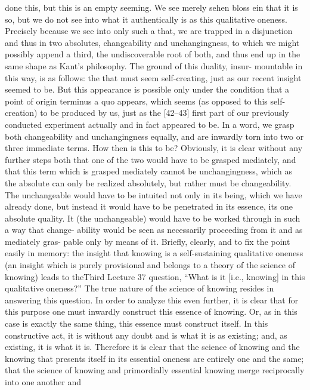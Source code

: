 done this, but this is an empty seeming. We see merely {sehen bloss ein} that it
is so, but we do not see into what it authentically is as this qualitative oneness.
Precisely because we see into only such a that, we are trapped in a disjunction
and thus in two absolutes, changeability and unchangingness, to which we
might possibly append a third, the undiscoverable root of both, and thus end
up in the same shape as Kant’s philosophy. The ground of this duality, insur-
mountable in this way, is as follows: the that must seem self-creating, just as
our recent insight seemed to be. But this appearance is possible only under the
condition that a point of origin {terminus a quo} appears, which seems (as
opposed to this self-creation) to be produced by us, just as the [42–43] first
part of our previously conducted experiment actually and in fact appeared to
be. In a word, we grasp both changeability and unchangingness equally, and
are inwardly torn into two or three immediate terms. How then is this to be?
Obviously, it is clear without any further steps both that one of the two would
have to be grasped mediately, and that this term which is grasped mediately
cannot be unchangingness, which as the absolute can only be realized
absolutely, but rather must be changeability. The unchangeable would have to
be intuited not only in its being, which we have already done, but instead it
would have to be penetrated in its essence, its one absolute quality. It (the
unchangeable) would have to be worked through in such a way that change-
ability would be seen as necessarily proceeding from it and as mediately gras-
pable only by means of it.
Briefly, clearly, and to fix the point easily in memory: the insight that
knowing is a self-sustaining qualitative oneness (an insight which is purely
provisional and belongs to a theory of the science of knowing) leads to theThird Lecture
37
question, “What is it [i.e., knowing] in this qualitative oneness?” The true
nature of the science of knowing resides in answering this question. In order
to analyze this even further, it is clear that for this purpose one must inwardly
construct this essence of knowing. Or, as in this case is exactly the same thing,
this essence must construct itself. In this constructive act, it is without any
doubt and is what it is as existing; and, as existing, it is what it is. Therefore it
is clear that the science of knowing and the knowing that presents itself in its
essential oneness are entirely one and the same; that the science of knowing
and primordially essential knowing merge reciprocally into one another and
